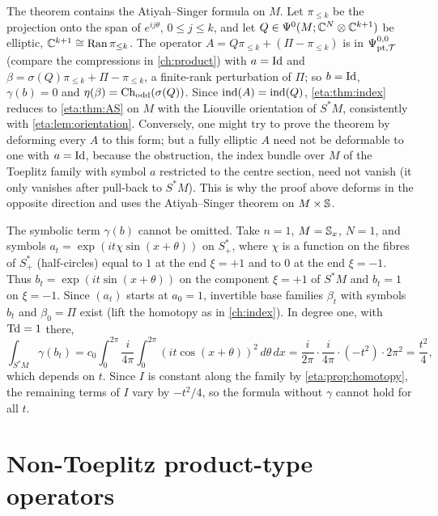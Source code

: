 \begin{remark}\label{eta:rem:finite-rank}
The theorem contains the Atiyah--Singer formula on $M$. Let $\pi_{\le k}$ be the
projection onto the span of $e^{ij\theta}$, $0\le j\le k$, and let
$Q\in\Psi^{0}(M;\mathbb{C}^N\otimes\mathbb{C}^{k+1})$ be elliptic, $\mathbb{C}^{k+1}\cong\operatorname{Ran}\pi_{\le k}$. The
operator $A=Q\pi_{\le k}+(\Pi-\pi_{\le k})$ is in $\Psi^{0,0}_{\mathrm{pt},\mathcal{T}}$ (compare the compressions
in \cref{ch:product}) with $a=\operatorname{Id}$ and $\beta=\sigma(Q)\pi_{\le k}+\Pi-\pi_{\le k}$, a
finite-rank perturbation of $\Pi$; so $b=\operatorname{Id}$, $\gamma(b)=0$ and
$\eta(\beta)=\operatorname{Ch}_{\mathrm{odd}}(\sigma(Q))$. Since $\operatorname{ind}(A)=\operatorname{ind}(Q)$, \cref{eta:thm:index} reduces to
\cref{eta:thm:AS} on $M$ with the Liouville orientation of $S^*M$, consistently with
\cref{eta:lem:orientation}. Conversely, one might try to prove the theorem by
deforming every $A$ to this form; but a fully elliptic $A$ need not be deformable to one
with $a=\operatorname{Id}$, because the obstruction, the index bundle over $M$ of the Toeplitz family
with symbol $a$ restricted to the centre section, need not vanish (it only vanishes
after pull-back to $S^*M$). This is why the proof above deforms in the opposite
direction and uses the Atiyah--Singer theorem on $M\times\mathbb{S}$.
\end{remark}

\begin{remark}\label{eta:rem:gamma}
The symbolic term $\gamma(b)$ cannot be omitted. Take $n=1$, $M=\mathbb{S}_x$, $N=1$, and
symbols $a_t=\exp(it\chi\sin(x+\theta))$ on $S^*_+$, where $\chi$ is a function on the
fibres of $S^*_+$ (half-circles) equal to $1$ at the end $\xi=+1$ and to $0$ at the end
$\xi=-1$. Thus $b_t=\exp(it\sin(x+\theta))$ on the component $\xi=+1$ of $S^*M$ and
$b_t=1$ on $\xi=-1$. Since $(a_t)$ starts at $a_0=1$, invertible base families $\beta_t$
with symbols $b_t$ and $\beta_0=\Pi$ exist (lift the homotopy as in \cref{ch:index}). In
degree one, with $\operatorname{Td}=1$ there,
\[
\int_{S^*M}\gamma(b_t)=c_0\int_0^{2\pi}\frac{i}{4\pi}\int_0^{2\pi}
(it\cos(x+\theta))^2\,d\theta\,dx=\frac{i}{2\pi}\cdot\frac{i}{4\pi}\cdot(-t^2)\cdot2\pi^2
=\frac{t^2}4,
\]
which depends on $t$. Since $I$ is constant along the family by
\cref{eta:prop:homotopy}, the remaining terms of $I$ vary by $-t^2/4$, so the formula
without $\gamma$ cannot hold for all $t$.
\end{remark}

\section{Non-Toeplitz product-type operators}\label{eta:sec:full}

